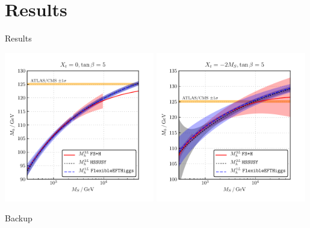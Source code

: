 \documentclass[hyperref={pdfpagelabels=false},ngerman]{beamer}
\begin{document}
\section{Results}

\begin{frame}{Results}
  \begin{center}
    \includegraphics[width=0.49\textwidth]{plots/kuts/Mh_MS_TB-5_Xt-0}\hfill
    \includegraphics[width=0.49\textwidth]{plots/kuts/Mh_MS_TB-5_Xt--2}
  \end{center}
\end{frame}

\begin{frame}[noframenumbering]
  \begin{center}
    \Huge Backup
  \end{center}
\end{frame}
\end{document}
